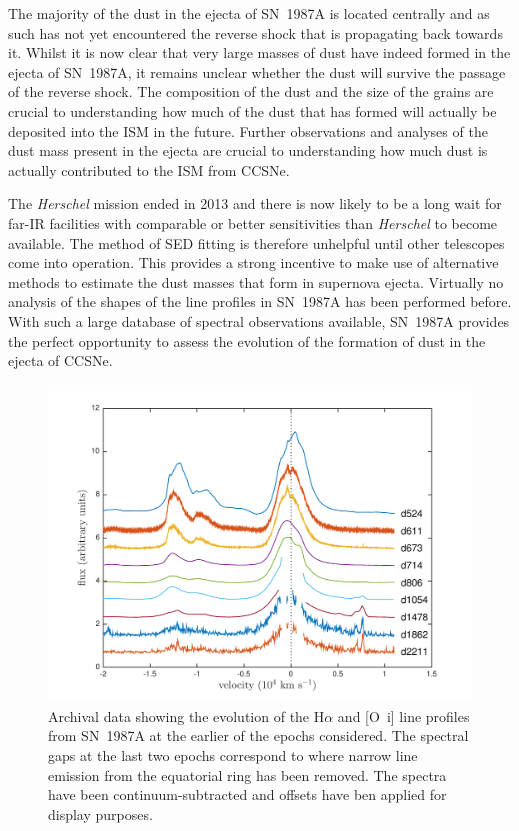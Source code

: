 The majority of the dust in the ejecta of SN~1987A is located centrally and as such has not yet encountered the reverse shock that is propagating back towards it.  Whilst it is now clear that very large masses of dust have indeed formed in the ejecta of SN~1987A, it remains unclear whether the dust will survive the passage of the reverse shock.  The composition of the dust and the size of the grains are crucial to understanding how much of the dust that has formed will actually be deposited into the ISM in the future.  Further observations and analyses of the dust mass present in the ejecta are  crucial to understanding how much dust is actually contributed to the ISM from CCSNe.




The {\em Herschel} mission ended in 2013 and there is now likely to be a long wait for far-IR facilities with comparable or better sensitivities than {\em Herschel} to become available.  The method of SED fitting is therefore unhelpful until other telescopes come into operation.  This provides a strong incentive to make use of alternative methods to estimate the dust masses that form in supernova ejecta.  Virtually no analysis of the shapes of the line profiles in SN~1987A has been performed before.  With such a large database of spectral observations available, SN~1987A provides the perfect opportunity to assess the evolution of the formation of dust in the ejecta of CCSNe.  

\begin{figure}
\centering
\includegraphics[trim =39 10 45 15,clip=true,scale=0.7]{chapters/chapter5/images/Ha_evol_early_1col2.pdf}
\caption{Archival data showing the evolution of the H$\alpha$ and
[O~{\sc i}] line profiles from SN~1987A at the earlier of the epochs considered. The 
spectral gaps at the last two epochs correspond to where narrow line 
emission from the equatorial ring has been removed. The spectra have been
continuum-subtracted and offsets have ben applied for display purposes.}
\label{Ha_evol_early}
\end{figure}

